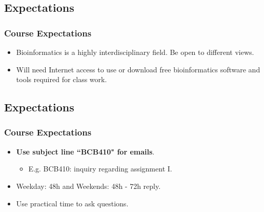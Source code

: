 \documentclass[11pt]{beamer}
\begin{document}
\subsection{Expectations}
\begin{frame}
\frametitle{Course Expectations}
\begin{itemize}
\item Bioinformatics is a highly interdisciplinary field. Be open to different views. 
\vspace{0.2in}
\item Will need Internet access to use  or download free bioinformatics software and tools required for class work. 
\vspace{0.2in}
\vspace{0.2in}
\end{itemize}
\end{frame}

\subsection{Expectations}
\begin{frame}
\frametitle{Course Expectations}
\begin{itemize}
\item \textbf{Use subject line ``BCB410" for emails}.
\begin{itemize}
\item E.g. BCB410: inquiry regarding assignment I. 
\end{itemize}
\vspace{0.2in}
\item Weekday: 48h and Weekends: 48h - 72h reply.
\vspace{0.2in}
\item Use practical time to ask questions.
\end{itemize}
\end{frame}
\end{document}
